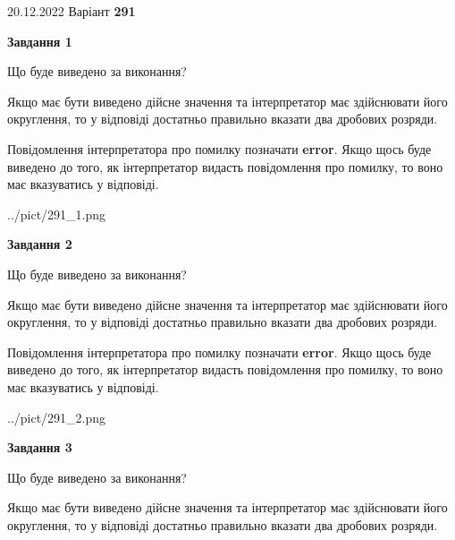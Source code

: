 \documentclass[12pt, ukrainian]{article}
\begin{document}
{20.12.2022 Варіант \No \textbf { 291 }\par}
{
\begin {Large}

{\begin {center}\textbf{Завдання 1}\end {center}}\par
Що буде виведено за виконання? \par

Якщо має бути виведено дійсне значення та інтерпретатор має здійснювати його округлення, 
то у відповіді достатньо правильно вказати два дробових розряди.

Повідомлення інтерпретатора про помилку позначати \textbf{error}.
Якщо щось буде виведено до того, як інтерпретатор видасть повідомлення про помилку, 
то воно має вказуватись у відповіді. \par

\begin{center}
	{../pict/291_1.png}
\end{center}
\newpage

{\begin {center}\textbf{Завдання 2}\end {center}}\par
Що буде виведено за виконання? \par

Якщо має бути виведено дійсне значення та інтерпретатор має здійснювати його округлення, 
то у відповіді достатньо правильно вказати два дробових розряди.

Повідомлення інтерпретатора про помилку позначати \textbf{error}.
Якщо щось буде виведено до того, як інтерпретатор видасть повідомлення про помилку, 
то воно має вказуватись у відповіді. \par

\begin{center}
	{../pict/291_2.png}
\end{center}
\newpage

{\begin {center}\textbf{Завдання 3}\end {center}}\par
Що буде виведено за виконання? \par

Якщо має бути виведено дійсне значення та інтерпретатор має здійснювати його округлення, 
то у відповіді достатньо правильно вказати два дробових розряди.


\end{Large}}
\end{document}
